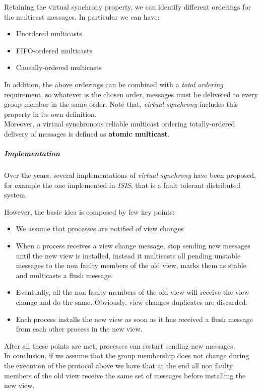 Retaining the virtual synchrony property, we can identify different orderings for the multicast messages. In particular we can have:
\begin{itemize}
    \item Unordered multicasts
    \item FIFO-ordered multicasts
    \item Causally-ordered multicasts
\end{itemize}
In addition, the above orderings can be combined with a \textit{total ordering} requirement, so whatever is the chosen order, messages must be delivered to every group member in the same order. Note that, \textit{virtual synchrony} includes this property in its own definition.\\
Moreover, a virtual synchronous reliable multicast ordering totally-ordered delivery of messages is defined as \textbf{atomic multicast}.

\subparagraph{Implementation}\label{implementation}
Over the years, several implementations of \textit{virtual synchrony} have been proposed, for example the one implemented in \textit{ISIS}, that is a fault tolerant distributed system.

However, the basic idea is composed by few key points:
\begin{itemize}
    \item We assume that processes are notified of view changes
    \item When a process receives a view change message, stop sending new messages until the new view is installed, instead it multicasts all pending unstable messages to the non faulty members of the old view, marks them as stable and multicasts a flush message
    \item Eventually, all the non faulty members of the old view will receive the view change and do the same. Obviously, view changes duplicates are discarded.
    \item Each process installs the new view as soon as it has received a flush message from each other process in the new view.
\end{itemize}
After all these points are met, processes can restart sending new messages.\\
In conclusion, if we assume that the group membership does not change during the execution of the protocol above we have that at the end all non faulty members of the old view receive the same set of messages before installing the new view.

